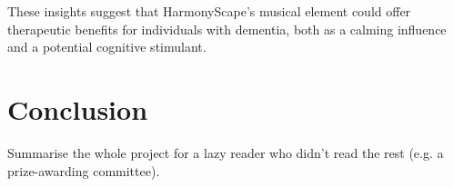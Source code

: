 \documentclass{l4proj}
\begin{document}
These insights suggest that HarmonyScape's musical element could offer therapeutic benefits for individuals with dementia, both as a calming influence and a potential cognitive stimulant.








\chapter{Conclusion}    
Summarise the whole project for a lazy reader who didn't read the rest (e.g. a prize-awarding committee).
\end{document}
